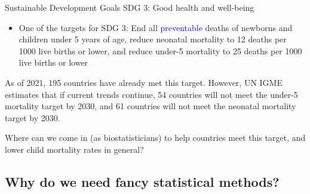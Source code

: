 \documentclass[10pt,t]{beamer}
\begin{document}
\begin{frame}{Sustainable Development Goals}
SDG 3: Good health and well-being

\vspace{0.3cm}

\begin{itemize}
	\item One of the targets for SDG 3: End all \textcolor{blue}{preventable} deaths of newborns and children under 5 years of age, reduce neonatal mortality to 12 deaths per 1000 live births or lower, and reduce under-5 mortality to 25 deaths per 1000 live births or lower 
\end{itemize}

\vspace{0.3cm}

\pause As of 2021, 195 countries have already met this target. However, UN IGME estimates that if current trends continue, 54 countries will not meet the under-5 mortality target by 2030, and 61 countries will not meet the neonatal mortality target by 2030.

\vspace{0.3cm}

\pause Where can we come in (as biostatisticians) to help countries meet this target, and lower child mortality rates in general?
\end{frame}

\subsection{Why do we need fancy statistical methods?}
\end{document}
